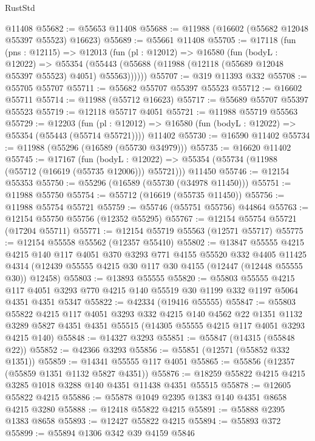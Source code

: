 \begin{lexlean}{RustStd}
\begin{coremodule}
    @11408
@55682 := @55653 @11408
@55688 := @11988 (@16602 (@55682 @12048 @55397 @55523) @16623)
@55689 := @55661 @11408
@55705 := @17118
    (fun (pns : @12115) =>
    @12013
      (fun (pl : @12012) =>
      @16580
        (fun (bodyL : @12022) =>
        @55354 (@55443 (@55688 (@11988 (@12118 (@55689 @12048 @55397 @55523) @4051) @55563))))))
@55707 := @319 @11393 @332
@55708 := @55705 @55707
@55711 := @55682 @55707 @55397 @55523
@55712 := @16602 @55711
@55714 := @11988 (@55712 @16623)
@55717 := @55689 @55707 @55397 @55523
@55719 := @12118 @55717 @4051
@55721 := @11988 @55719 @55563
@55729 := @12203
    (fun (pl : @12012) => @16580 (fun (bodyL : @12022) => @55354 (@55443 (@55714 @55721))))
    @11402
@55730 := @16590 @11402
@55734 := @11988 (@55296 (@16589 (@55730 @34979)))
@55735 := @16620 @11402
@55745 := @17167
    (fun (bodyL : @12022) => @55354 (@55734 (@11988 (@55712 (@16619 (@55735 @12006))) @55721)))
    @11450
@55746 := @12154 @55353
@55750 := @55296 (@16589 (@55730 (@34978 @11450)))
@55751 := @11988 @55750
@55754 := @55712 (@16619 (@55735 @11450))
@55756 := @11988 @55754 @55721
@55759 := @55746 (@55751 @55756) @44864
@55763 := @12154 @55750 @55756 (@12352 @55295)
@55767 := @12154 @55754 @55721 (@17204 @55711)
@55771 := @12154 @55719 @55563 (@12571 @55717)
@55775 := @12154 @55558 @55562 (@12357 @55410)
@55802 := @13847
    @55555
    @4215
    @4215
    @140
    @117
    @4051
    @370
    @3293
    @771
    @4155
    @55520
    @332
    @4405
    @11425
    @4314
    (@12439 @55555 @4215 @30 @117 @30 @4155 (@12447 (@12448 @55555 @30)) @12458)
@55803 := @13893 @55555
@55820 := @55803
    @55555
    @4215
    @117
    @4051
    @3293
    @770
    @4215
    @140
    @55519
    @30
    @1199
    @332
    @1197
    @5064
    @4351
    @4351
    @5347
@55822 := @42334 (@19416 @55555)
@55847 := @55803
    @55822
    @4215
    @117
    @4051
    @3293
    @332
    @4215
    @140
    @4562
    @22
    @1351
    @1132
    @3289
    @5827
    @4351
    @4351
    @55515
    (@14305 @55555 @4215 @117 @4051 @3293 @4215 @140)
@55848 := @14327 @3293
@55851 := @55847 (@14315 (@55848 @22))
@55852 := @42366 @3293
@55856 := @55851 (@12571 (@55852 @332 @1351))
@55859 := @14341 @55555 @117 @4051
@55865 := @55856 (@12357 (@55859 @1351 @1132 @5827 @4351))
@55876 := @18259 @55822 @4215 @4215 @3285 @1018 @3288 @140 @4351 @11438 @4351 @55515
@55878 := @12605 @55822 @4215
@55886 := @55878 @1049 @2395 @1383 @140 @4351 @8658 @4215 @3280
@55888 := @12418 @55822 @4215
@55891 := @55888 @2395 @1383 @8658
@55893 := @12427 @55822 @4215
@55894 := @55893 @372
@55899 := @55894 @1306 @342 @39 @4159 @5846

\end{coremodule}
\end{lexlean}
